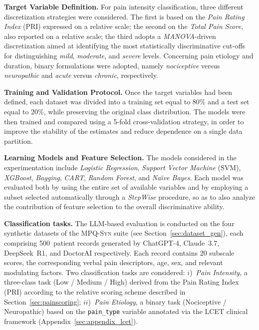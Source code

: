 \documentclass[preprint,12pt,authoryear]{elsarticle}
\newcommand{\dbsuite}{\small\textsc{MPQ-Syn}\xspace}
\begin{document}
\textbf{Target Variable Definition.} For pain intensity classification, three different discretization strategies were considered. The first is based on the \textit{Pain Rating Index} (PRI) expressed on a relative scale; the second on the \textit{Total Pain Score}, also reported on a relative scale; the third adopts a \textit{MANOVA}-driven discretization aimed at identifying the most statistically discriminative cut-offs for distinguishing \textit{mild}, \textit{moderate}, and \textit{severe} levels. Concerning pain etiology and duration, binary formulations were adopted, namely \textit{nociceptive} versus \textit{neuropathic} and \textit{acute} versus \textit{chronic}, respectively.

\textbf{Training and Validation Protocol.} Once the target variables had been defined, each dataset was divided into a training set equal to 80\% and a test set equal to 20\%, while preserving the original class distribution. The models were then trained and compared using a 5-fold cross-validation strategy, in order to improve the stability of the estimates and reduce dependence on a single data partition.

\textbf{Learning Models and Feature Selection.} The models considered in the experimentation include \textit{Logistic Regression}, \textit{Support Vector Machine} (SVM), \textit{XGBoost}, \textit{Bagging}, \textit{CART}, \textit{Random Forest}, and \textit{Na\"{\i}ve Bayes}. Each model was evaluated both by using the entire set of available variables and by employing a subset selected automatically through a \textit{StepWise} procedure, so as to also analyze the contribution of feature selection to the overall discriminative ability.

\textbf{Classification tasks.} The LLM-based evaluation is conducted on the four synthetic datasets of the \dbsuite suite (see Section~\ref{sec:dataset_gen}), each comprising 500~patient records generated by ChatGPT-4, Claude~3.7, DeepSeek~R1, and DoctorAI respectively. Each record contains 20 subscale scores, the corresponding verbal pain descriptors, age, sex, and relevant modulating factors. Two classification tasks are considered: $i$)~\textit{Pain Intensity}, a three-class task (Low / Medium / High) derived from the Pain Rating Index (PRI) according to the relative scoring scheme described in Section~\ref{sec:painscoring}; $ii$)~\textit{Pain Etiology}, a binary task (Nociceptive / Neuropathic) based on the \texttt{pain\_type} variable annotated via the LCET clinical framework (Appendix~\ref{sec:appendix_lcet}).
\end{document}
